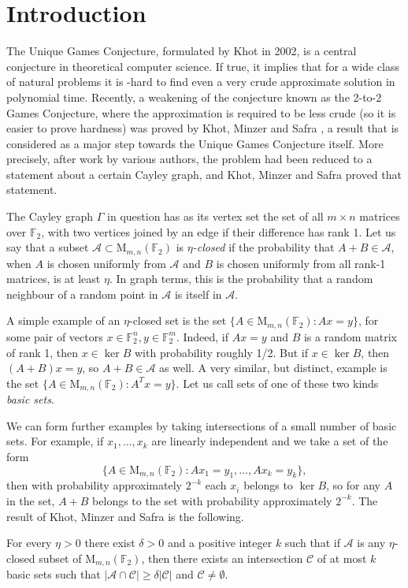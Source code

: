 \documentclass{toc}
\newcommand\F{\mathbb{F}}
\renewcommand\d{\delta}
\newcommand \cA{\mathcal A}
\newcommand \cC{\mathcal C}
\newcommand \mn{\mathrm{M}_{m,n}(\F_2)}
\begin{document}
%
%
%

\section{Introduction}

The Unique Games Conjecture, formulated by Khot \cite{khot} in 2002, is a central conjecture in theoretical computer science. If true, it implies that for a wide class of natural problems it is -hard to find even a very crude approximate solution in polynomial time. Recently, a weakening of the conjecture known as the 2-to-2 Games Conjecture, where the approximation is required to be less crude (so it is easier to prove hardness) was proved by Khot, Minzer and Safra \cite{KMS}, a result that is considered as a major step towards the Unique Games Conjecture itself. More precisely, after work by various authors, the problem had been reduced to a statement about a certain Cayley graph, and Khot, Minzer and Safra proved that statement.

The Cayley graph $\Gamma$ in question has as its vertex set the set of all $m\times n$ matrices over $\F_2$, with two vertices joined by an edge if their difference has rank 1. Let us say that a subset $\mathcal A\subset\mn$ is \emph{$\eta$-closed} if the probability that $A+B\in\cA$, when $A$ is chosen uniformly from $\cA$ and $B$ is chosen uniformly from all rank-1 matrices, is at least $\eta$. In graph terms, this is the probability that a random neighbour of a random point in $\cA$ is itself in $\cA$. 

A simple example of an $\eta$-closed set is the set $\{A\in\mn:Ax=y\}$, for some pair of vectors $x\in \F_2^n,y\in\F_2^m$. Indeed, if $Ax=y$ and $B$ is a random matrix of rank 1, then $x\in\ker B$ with probability roughly 1/2.
But if $x\in\ker B$, then $(A+B)x=y$, so $A+B\in\cA$ as well. A very similar, but distinct, example is the set $\{A\in\mn:A^Tx=y\}$. Let us call sets of one of these two kinds \emph{basic sets}.

We can form further examples by taking intersections of a small number of basic sets. For example, if $x_1,\dots,x_k$ are linearly independent and we take a set of the form 
\[\{A\in\mn:Ax_1=y_1,\dots,Ax_k=y_k\},\] 
then with probability approximately $2^{-k}$ each $x_i$ belongs to $\ker B$, so for any $A$ in the set, $A+B$ belongs to the set with probability approximately $2^{-k}$. The result of Khot, Minzer and Safra is the following.

\begin{theorem} \label{KMS}
	For every $\eta>0$ there exist $\delta>0$ and a positive integer $k$ such that if $\cA$ is any  $\eta$-closed subset of $\mn$, then there exists an intersection $\cC$ of at most $k$ basic sets such that $|\cA\cap \cC|\geq\d|\cC|$ and $\cC\neq \emptyset$.
\end{theorem}
\end{document}
